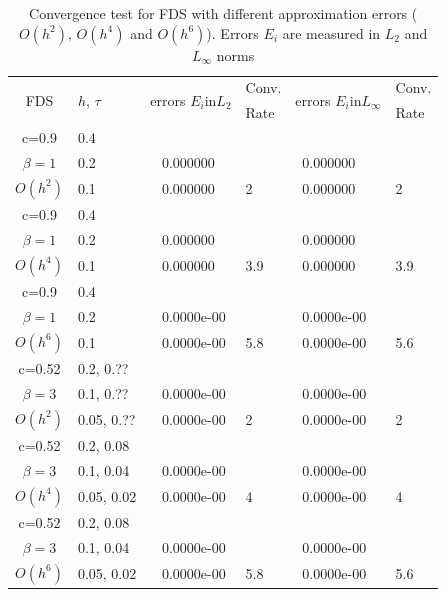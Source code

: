 \documentclass[11pt,a4paper,twoside]{article}
\begin{document}
\begin{center}
\begin{table}[ht]
\centering
		\begin{tabular}{||c|l|ll|ll||}
			\hline
			\hline
      \multirow{2  }{*}{FDS}        & \multirow{2  }{*}{$h$, $\tau$}  & \multirow{2  }{*}{errors $E_i$in$L_2$}  &Conv.& \multirow{2  }{*}{errors $E_i$in$L_\infty$}  &Conv.  \\
	         &                    &                               & Rate   &                                        & Rate \\
   			\hline 
					\hline 
      c=0.9    &0.4    &             &            &           &   \\
  $\beta=1$   &0.2    &~ 0.000000  &            &~0.000000 &   \\
  $O(h^2)$ &0.1   &~ 0.000000  &2  &~0.000000 & 2 \\
			\hline
      c=0.9    &0.4   &            &            &             &    \\
      $\beta=1$  &0.2   &~ 0.000000   &           &~0.000000  &   \\
       $O(h^4)$ &0.1  &~ 0.000000 & 3.9    &~0.000000  & 3.9  \\
    \hline
   c=0.9       &0.4   &            &        &                  &      \\
    $\beta=1$   &0.2  &~ 0.0000e-00 &           &~0.0000e-00      &       \\
     $O(h^6)$ &0.1 &~ 0.0000e-00 &5.8  &~0.0000e-00 & 5.6        \\
	   \hline
			\hline 
   c=0.52       &0.2, 0.??   &            &        &                  &      \\
    $\beta=3$   &0.1, 0.??   &~ 0.0000e-00 &           &~0.0000e-00      &       \\
     $O(h^2)$ &0.05, 0.?? &~ 0.0000e-00 &2  &~0.0000e-00 & 2        \\
			\hline 
   c=0.52       &0.2, 0.08   &            &        &                  &      \\
    $\beta=3$   &0.1, 0.04   &~ 0.0000e-00 &           &~0.0000e-00      &       \\
     $O(h^4)$ &0.05, 0.02 &~ 0.0000e-00 &4  &~0.0000e-00 & 4        \\
			\hline 
   c=0.52       &0.2, 0.08   &            &        &                  &      \\
    $\beta=3$   &0.1, 0.04   &~ 0.0000e-00 &           &~0.0000e-00      &       \\
     $O(h^6)$ &0.05, 0.02 &~ 0.0000e-00 &5.8  &~0.0000e-00 & 5.6        \\
	   \hline
			\hline 
		\end{tabular}
		\caption{Convergence test for FDS with different approximation errors ($O(h^{2})$, $O(h^{4})$ and $O(h^{6})$). Errors $E_i$ are measured in $L_2$ and $L_\infty$ norms}

\label{tab:a}
\end{table}
\end{center}
\end{document}
